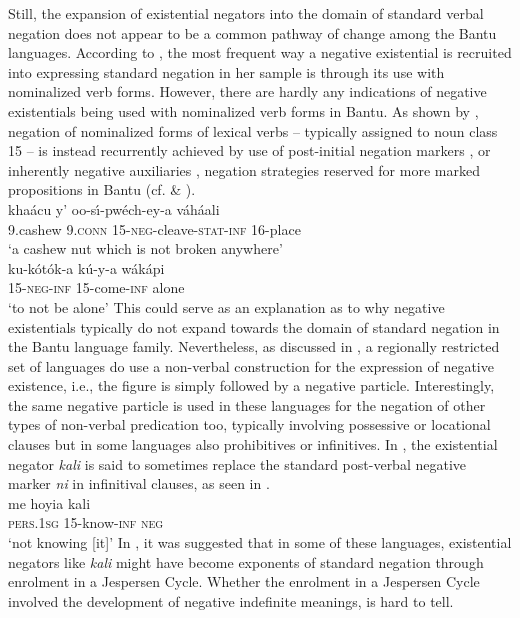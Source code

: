 \documentclass[output=paper]{langscibook}
\begin{document}
Still, the expansion of existential negators into the domain of standard
verbal negation does not appear to be a common pathway of change among the
Bantu languages. According to \citet{Veselinova2016}, the most frequent way
a negative existential is recruited into expressing standard negation in
her sample is through its use with nominalized verb forms. However, there
are hardly any indications of negative existentials being used with
nominalized verb forms in Bantu. As shown by
\citet{Guldemann1996,Guldemann1999}, negation of nominalized forms of
lexical verbs -- typically assigned to noun class 15 -- is instead recurrently achieved by use of post-initial negation markers , or inherently negative auxiliaries , negation strategies reserved for more marked propositions in Bantu (cf.  \& ).
%
\ea\label{ex:shangaji-cashew}
\\
\gll kha{\'a}cu y' oo-s\'\i-pw{\'e}ch-ey-a v{\'a}h{\'a}ali\\
9.cashew 9.\textsc{conn} 15-\textsc{neg}-cleave-\textsc{stat-inf} 16-place\\
\glt `a cashew nut which is not broken anywhere'
\z
%
\ea\label{ex:manda-alone}
\\
\gll ku-k{\'o}t{\'o}k-a k{\'u}-y-a w{\'a}k{\'a}pi\\
15-\textsc{neg-inf} 15-come-\textsc{inf} alone\\
\glt `to not be alone'
\z
%
This could serve as an explanation as to why negative existentials typically do not expand towards the domain of standard negation in the Bantu language family. Nevertheless, as discussed in , a regionally restricted set of languages do use a non-verbal construction for the expression of negative existence, i.e., the figure is simply followed by a negative particle. Interestingly, the same negative particle is used in these languages for the negation of other types of non-verbal predication too, typically involving possessive or locational clauses but in some languages also prohibitives or infinitives. In , the existential negator \textit{kali} is said to sometimes replace the standard post-verbal negative marker \textit{ni} in infinitival clauses, as seen in .
%
\ea\label{ex:mbete-know}
\\
\gll me hoyia kali\\
\textsc{pers.1sg} 15-know-\textsc{inf} \textsc{neg}\\
\glt `not knowing [it]'
\z
In , it was suggested that in some of these languages, existential negators like \textit{kali} might have become exponents of standard negation through enrolment in a Jespersen Cycle. Whether the enrolment in a Jespersen Cycle involved the development of negative indefinite meanings, is hard to tell.
\end{document}
